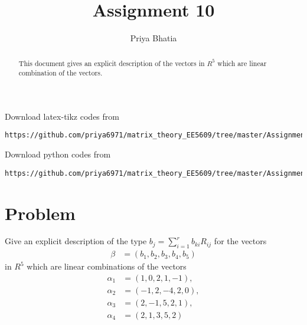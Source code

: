 \documentclass[journal,12pt,twocolumn]{IEEEtran}
\begin{document}
     \def\rightbox#1{\makebox[0in][r]{#1}}
     \def\centbox#1{\makebox[0in]{#1}}
     \def\topbox#1{\raisebox{-\baselineskip}[0in][0in]{#1}}
     \def\midbox#1{\raisebox{-0.5\baselineskip}[0in][0in]{#1}}
\vspace{3cm}
\title{Assignment 10}
\author{Priya Bhatia}
\maketitle
\newpage
\bigskip
\renewcommand{\thefigure}{\theenumi}
\renewcommand{\thetable}{\theenumi}
\begin{abstract}
This document gives an explicit description of the vectors in $R^5$ which are linear combination of the vectors.
\end{abstract}
%
Download latex-tikz codes from 
%
\begin{lstlisting}
https://github.com/priya6971/matrix_theory_EE5609/tree/master/Assignment10
\end{lstlisting}
%
%
Download python codes from 
%
\begin{lstlisting}
https://github.com/priya6971/matrix_theory_EE5609/tree/master/Assignment10/codes
\end{lstlisting}
%
\section{\textbf{Problem}}
Give an explicit description of the type $b_j=\sum_{i=1}^{r} b_{ki}R_{ij}$ for the vectors
\begin{align}
    \beta &= (b_1,b_2,b_3,b_4,b_5) \nonumber
\end{align}
in $R^5$ which are linear combinations of the vectors
\begin{align}
    \alpha_1 &= (1,0,2,1,-1), \\
    \alpha_2 &= (-1,2,-4,2,0), \\
    \alpha_3 &= (2,-1,5,2,1), \\
    \alpha_4 &= (2,1,3,5,2)
\end{align}
\end{document}
